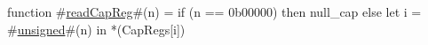 function #\hyperref[sailMIPSzreadCapReg]{readCapReg}#(n) =
  if (n == 0b00000) then
    null_cap
  else
    let i = #\hyperref[sailMIPSzunsigned]{unsigned}#(n) in
    *(CapRegs[i])
